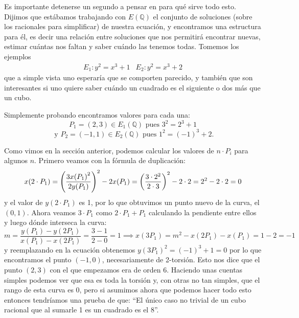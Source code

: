 \documentclass[a4paper]{book}
\theoremstyle{definition}
\theoremstyle{plain}
\newcommand{\QQ}{\mathbb{Q}}
\newcommand{\lp}{\left\lparen}
\newcommand{\rp}{\right\rparen}
\begin{document}
Es importante detenerse un segundo a pensar en para qué sirve todo esto. Dijimos que estábamos trabajando con $E(\QQ)$ el conjunto de soluciones (sobre los racionales para simplificar) de nuestra ecuación, y encontramos una estructura para él, es decir una relación entre soluciones que nos permitirá encontrar nuevas, estimar cuántas nos faltan y saber cuándo las tenemos todas. Tomemos los ejemplos
\[
\begin{array}{cc}
E_1: y^2 = x^3+1 &
E_2: y^2 = x^3+2
\end{array}
\]
que a simple vista uno esperaría que se comporten parecido, y también que son interesantes si uno quiere saber cuándo un cuadrado es el siguiente o dos más que un cubo. 

Simplemente probando encontramos valores para cada una:
\[
P_1 = (2,3) \in E_1(\QQ) \text{ pues } 3^2 = 2^3+1
\]
\[
\text{ y } P_2 = (-1,1) \in E_2(\QQ) \text{ pues } 1^2 = {(-1)}^3+2.
\]

Como vimos en la sección anterior, podemos calcular los valores de $n\cdot P_i$ para algunos $n$. Primero veamos con la fórmula de duplicación:
\[
x(2\cdot P_1) = {\lp \frac{3{x(P_1)}^2}{2y(P_1)} \rp}^2 - 2x(P_1) = {\lp \frac{3\cdot 2^2}{2\cdot 3} \rp}^2 - 2\cdot 2 = 2^2-2\cdot 2 = 0
\]
y el valor de $y(2\cdot P_1)$ es 1, por lo que obtuvimos un punto nuevo de la curva, el $(0,1)$. Ahora veamos $3\cdot P_1$ como $2\cdot P_1 + P_1$ calculando la pendiente entre ellos y luego dónde interseca la curva:
\[
m= \frac{y(P_1)- y(2P_1)}{x(P_1)- x(2P_1)} = \frac{3-1}{2-0} = 1 \implies x(3P_1) = m^2-x(2P_1)-x(P_1) = 1-2 = -1
\]
y reemplazando en la ecuación obtenemos ${y(3P_1)}^2 = {(-1)}^3+1 = 0$ por lo que encontramos el punto $(-1,0)$, necesariamente de 2-torsión. Esto nos dice que el punto $(2,3)$ con el que empezamos era de orden 6. Haciendo unas cuentas simples podemos ver que esa es toda la torsión y, con otras no tan simples, que el rango de esta curva es 0, pero si asumimos ahora que podemos hacer todo esto entonces tendríamos una prueba de que: ``El único caso no trivial de un cubo racional que al sumarle 1 es un cuadrado es el 8''.
\end{document}
